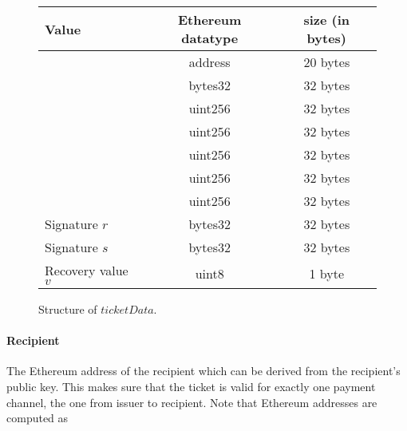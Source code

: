 \begin{figure}[H]
      \centering
      \begin{tabular}{|l|c|c|}
            \hline
            \textbf{Value}                                    & \textbf{Ethereum datatype} & \textbf{size (in bytes)} \\
            \hline
            \hline
            \nameref{sec:tickets:issuance:recipient}          & address                    & 20 bytes                 \\
            \nameref{sec:tickets:issuance:challenge}          & bytes32                    & 32 bytes                 \\
            \nameref{sec:tickets:issuance:ticketepoch}        & uint256                    & 32 bytes                 \\
            \nameref{sec:tickets:issuance:ticketvalue}        & uint256                    & 32 bytes                 \\
            \nameref{sec:tickets:issuance:winningprobability} & uint256                    & 32 bytes                 \\
            \nameref{sec:tickets:issuance:ticketindex}        & uint256                    & 32 bytes                 \\
            \nameref{sec:tickets:issuance:channelepoch}       & uint256                    & 32 bytes                 \\
            \hline
            \hline
            Signature $r$                                     & bytes32                    & 32 bytes                 \\
            Signature $s$                                     & bytes32                    & 32 bytes                 \\
            Recovery value $v$                                & uint8                      & 1 byte                   \\
            \hline
      \end{tabular}
      \caption{Structure of $ticketData$.}
\end{figure}

\paragraph{Recipient}
\label{sec:tickets:issuance:recipient}

The Ethereum address of the recipient which can be derived from the recipient's public key. This makes sure that the ticket is valid for exactly one payment channel, the one from issuer to recipient. Note that Ethereum addresses are computed as

